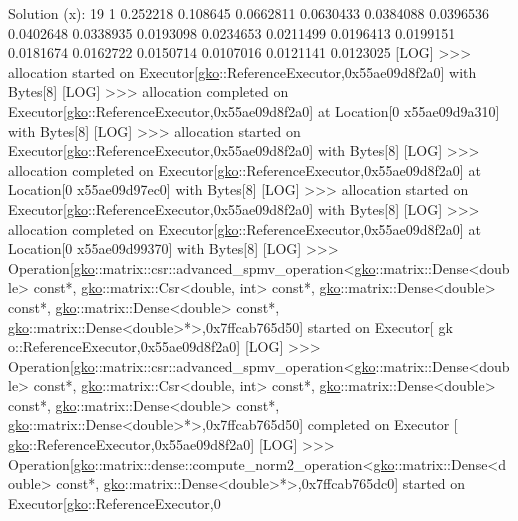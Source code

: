 \begin{DoxyCode}
                                                               
Solution (x):              
19 1
0.252218
0.108645
0.0662811
0.0630433
0.0384088
0.0396536
0.0402648
0.0338935
0.0193098
0.0234653
0.0211499
0.0196413
0.0199151
0.0181674
0.0162722
0.0150714
0.0107016
0.0121141
0.0123025
[LOG] >>> allocation started on Executor[\hyperlink{namespacegko}{gko}::ReferenceExecutor,0x55ae09d8f2a0] with Bytes[8]
[LOG] >>> allocation completed on Executor[\hyperlink{namespacegko}{gko}::ReferenceExecutor,0x55ae09d8f2a0] at Location[0
      x55ae09d9a310] with Bytes[8]
[LOG] >>> allocation started on Executor[\hyperlink{namespacegko}{gko}::ReferenceExecutor,0x55ae09d8f2a0] with Bytes[8]
[LOG] >>> allocation completed on Executor[\hyperlink{namespacegko}{gko}::ReferenceExecutor,0x55ae09d8f2a0] at Location[0
      x55ae09d97ec0] with Bytes[8]
[LOG] >>> allocation started on Executor[\hyperlink{namespacegko}{gko}::ReferenceExecutor,0x55ae09d8f2a0] with Bytes[8]
[LOG] >>> allocation completed on Executor[\hyperlink{namespacegko}{gko}::ReferenceExecutor,0x55ae09d8f2a0] at Location[0
      x55ae09d99370] with Bytes[8]
[LOG] >>> Operation[\hyperlink{namespacegko}{gko}::matrix::csr::advanced\_spmv\_operation<\hyperlink{namespacegko}{gko}::matrix::Dense<double> const*, 
      \hyperlink{namespacegko}{gko}::matrix::Csr<double, int> const*, \hyperlink{namespacegko}{gko}::matrix::Dense<double> const*, 
      \hyperlink{namespacegko}{gko}::matrix::Dense<double> const*, \hyperlink{namespacegko}{gko}::matrix::Dense<double>*>,0x7ffcab765d50] started on Executor[
      gk
o::ReferenceExecutor,0x55ae09d8f2a0]
[LOG] >>> Operation[\hyperlink{namespacegko}{gko}::matrix::csr::advanced\_spmv\_operation<\hyperlink{namespacegko}{gko}::matrix::Dense<double> const*, 
      \hyperlink{namespacegko}{gko}::matrix::Csr<double, int> const*, \hyperlink{namespacegko}{gko}::matrix::Dense<double> const*, 
      \hyperlink{namespacegko}{gko}::matrix::Dense<double> const*, \hyperlink{namespacegko}{gko}::matrix::Dense<double>*>,0x7ffcab765d50] completed on Executor
      [
\hyperlink{namespacegko}{gko}::ReferenceExecutor,0x55ae09d8f2a0]
[LOG] >>> Operation[\hyperlink{namespacegko}{gko}::matrix::dense::compute\_norm2\_operation<\hyperlink{namespacegko}{gko}::matrix::Dense<double> const*, 
      \hyperlink{namespacegko}{gko}::matrix::Dense<double>*>,0x7ffcab765dc0] started on Executor[\hyperlink{namespacegko}{gko}::ReferenceExecutor,0

\end{DoxyCode}
